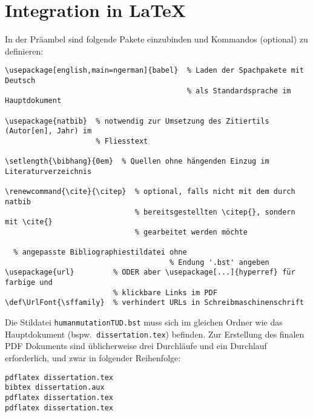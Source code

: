 \documentclass[a4paper,10pt]{scrartcl}
\renewcommand{\cite}{\citep}  %
\def\UrlFont{\sffamily}  %
\begin{document}
\section{Integration in \LaTeX}
In der Präambel sind folgende Pakete einzubinden und Kommandos (optional) zu
definieren:
\begin{singlespace}
\begin{Verbatim}[frame=single]
\usepackage[english,main=ngerman]{babel}  % Laden der Spachpakete mit Deutsch
                                          % als Standardsprache im Hauptdokument

\usepackage{natbib}  % notwendig zur Umsetzung des Zitiertils (Autor[en], Jahr) im
                     % Fliesstext

\setlength{\bibhang}{0em}  % Quellen ohne hängenden Einzug im Literaturverzeichnis

\renewcommand{\cite}{\citep}  % optional, falls nicht mit dem durch natbib
                              % bereitsgestellten \citep{}, sondern mit \cite{}
                              % gearbeitet werden möchte

  % angepasste Bibliographiestildatei ohne
                                      % Endung '.bst' angeben
\usepackage{url}         % ODER aber \usepackage[...]{hyperref} für farbige und
                         % klickbare Links im PDF
\def\UrlFont{\sffamily}  % verhindert URLs in Schreibmaschinenschrift
\end{Verbatim}
\end{singlespace}

Die Stildatei \verb|humanmutationTUD.bst| muss sich im gleichen Ordner wie
das Hauptdokument (bspw.\ \verb|dissertation.tex|) befinden. Zur Erstellung
des finalen PDF Dokuments sind üblicherweise drei  Durchläufe
und ein  Durchlauf erforderlich, und zwar in folgender
Reihenfolge:\\
\begin{center}
 \begin{minipage}{0.7\textwidth}
  \verb|pdflatex dissertation.tex|\\
  \verb|bibtex dissertation.aux|\\
  \verb|pdflatex dissertation.tex|\\
  \verb|pdflatex dissertation.tex|
 \end{minipage}
\end{center}


\end{document}
